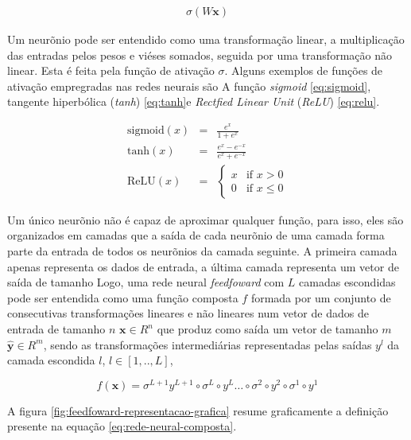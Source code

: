 \begin{eqnarray}\label{eq:neuronio-pitts-simplificado}
    \sigma(W\boldsymbol{x})
\end{eqnarray}

Um neurõnio pode ser entendido como uma transformação linear, a multiplicação
das entradas pelos pesos e viéses somados, seguida por uma
transformação não linear. Esta é feita pela função de ativação $\sigma$.
Alguns exemplos de funções de ativação empregradas nas redes neurais são A
função \textit{sigmoid} \ref{eq:sigmoid}, 
tangente hiperbólica (\textit{tanh}) \ref{eq:tanh}e 
\textit{Rectfied Linear Unit} (\textit{ReLU}) \ref{eq:relu}.

\begin{eqnarray}
    \text{sigmoid}(x) &=& \frac{e^x}{1 + e^x}\label{eq:sigmoid}
    \\
    \text{tanh}(x) &=& \frac{e^x - e^{-x}}{e^x + e^{-x}}\label{eq:tanh}
    \\ 
    \text{ReLU}(x) &=& \begin{cases} 
                        x & \text{if } x > 0 \\
                        0 & \text{if } x \leq 0 
                    \end{cases}\label{eq:relu}
\end{eqnarray}

Um único neurõnio não é capaz de aproximar qualquer função, para isso, eles são 
organizados em camadas que a saída de cada neurõnio de uma camada forma 
parte da entrada de todos os neurõnios da camada seguinte. 
A primeira camada apenas representa os dados de entrada, a última camada
representa um vetor de saída de tamanho 
Logo, uma rede neural \textit{feedfoward} com $L$ camadas escondidas 
pode ser entendida como uma função composta $f$ formada por 
um conjunto de consecutivas transformações lineares e não lineares num 
vetor de dados de entrada de tamanho $n$ $\boldsymbol{x} \in R^n$
que produz como saída um vetor de tamanho $m$ $\boldsymbol{\hat{y}} \in R^m$,  
sendo as transformações intermediárias representadas pelas saídas $y^l$ 
da camada escondida $l$, $l \in [1,..,L]$,

\begin{equation}\label{eq:rede-neural-composta}
    f(\boldsymbol{x}) = \sigma^{L + 1} y^{L + 1} \circ \sigma^{L} \circ y^{L} 
    \dots \circ \sigma^{2} \circ y^{2} \circ \sigma^{1} \circ y^{1}
\end{equation}

A figura \ref{fig:feedfoward-representacao-grafica} resume graficamente a
definição presente na equação \ref{eq:rede-neural-composta}.

